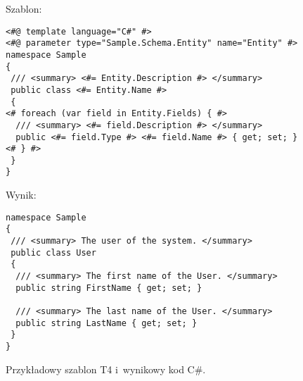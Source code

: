 \begin{figure}[!ht]
Szablon:

\begin{verbatim}
<#@ template language="C#" #>
<#@ parameter type="Sample.Schema.Entity" name="Entity" #>
namespace Sample
{
 /// <summary> <#= Entity.Description #> </summary>
 public class <#= Entity.Name #>
 {
<# foreach (var field in Entity.Fields) { #>
  /// <summary> <#= field.Description #> </summary>
  public <#= field.Type #> <#= field.Name #> { get; set; }
<# } #>
 }
}
\end{verbatim}

Wynik:

\begin{verbatim}
namespace Sample
{
 /// <summary> The user of the system. </summary>
 public class User
 {
  /// <summary> The first name of the User. </summary>
  public string FirstName { get; set; }
  
  /// <summary> The last name of the User. </summary>
  public string LastName { get; set; }
 }
}
\end{verbatim}

\caption{Przykładowy szablon T4 i~wynikowy kod C\#.}
\label{fig:implementation_core:t4}
\end{figure}
